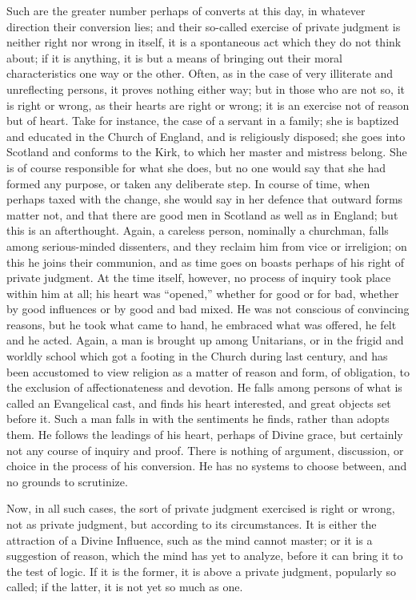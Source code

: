 Such are the greater number perhaps of converts at this day, in
whatever direction their conversion lies; and their so-called exercise
of private judgment is neither right nor wrong in itself, it is
a spontaneous act which they do not think about; if it is anything, it
is but a means of bringing out their moral characteristics one way or
the other. Often, as in the case of very illiterate and unreflecting
persons, it proves nothing either way; but in those who are not so, it
is right or wrong, as their hearts are right or wrong; it is an
exercise not of reason but of heart. Take for instance, the case of a
servant in a family; she is baptized and educated in the Church of
England, and is religiously disposed; she goes into Scotland and
conforms to the Kirk, to which her master and mistress belong. She is
of course responsible for what she does, but no one would say that she
had formed any purpose, or taken any deliberate step. In course of
time, when perhaps taxed with the change, she would say in her defence
that outward forms matter not, and that there are good men in Scotland
as well as in England; but this is an afterthought. Again, a careless
person, nominally a churchman, falls among serious-minded dissenters,
and they reclaim him from vice or irreligion; on this he joins their
communion, and as time goes on boasts perhaps of his right of private
judgment. At the time itself, however, no process of inquiry took
place within him at all; his heart was ``opened,'' whether for
good or for bad, whether by good influences or by good and bad mixed.
He was not conscious of convincing reasons, but he took what came to
hand, he embraced what was offered, he felt and he acted. Again, a man
is brought up among Unitarians, or in the frigid and worldly school
which got a footing in the Church during last century, and has been
accustomed to view religion as a matter of reason and form, of
obligation, to the exclusion of affectionateness and devotion. He
falls among persons of what is called an Evangelical cast, and
finds his heart interested, and great objects set before it. Such a
man falls in with the sentiments he finds, rather than adopts them. He
follows the leadings of his heart, perhaps of Divine grace, but
certainly not any course of inquiry and proof. There is nothing of
argument, discussion, or choice in the process of his conversion. He
has no systems to choose between, and no grounds to scrutinize.

Now, in all such cases, the sort of private judgment exercised is
right or wrong, not as private judgment, but according to its
circumstances. It is either the attraction of a Divine Influence, such
as the mind cannot master; or it is a suggestion of reason, which the
mind has yet to analyze, before it can bring it to the test of logic.
If it is the former, it is above a private judgment, popularly so
called; if the latter, it is not yet so much as one.

